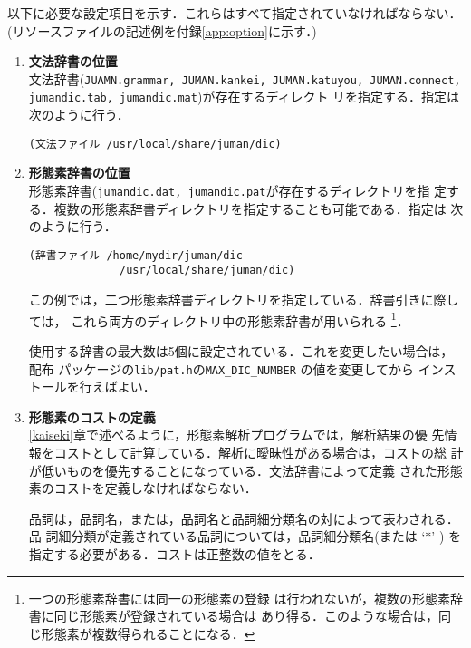 \documentclass[a4j,titlepage]{jarticle}
\begin{document}
以下に必要な設定項目を示す．これらはすべて指定されていなければならない．
(リソースファイルの記述例を付録\ref{app:option}に示す．)

\begin{enumerate}
\item {\bf 文法辞書の位置}\\
文法辞書({\tt JUAMN.grammar, JUMAN.kankei, JUMAN.katuyou,
JUMAN.connect, jumandic.tab, jumandic.mat})が存在するディレクト
リを指定する．指定は次のように行う．

\begin{verbatim}
(文法ファイル /usr/local/share/juman/dic)
\end{verbatim}

\item {\bf 形態素辞書の位置}\\
形態素辞書({\tt jumandic.dat, jumandic.pat}が存在するディレクトリを指
定する．複数の形態素辞書ディレクトリを指定することも可能である．指定は
次のように行う．

\begin{verbatim}
(辞書ファイル /home/mydir/juman/dic
              /usr/local/share/juman/dic)
\end{verbatim}

この例では，二つ形態素辞書ディレクトリを指定している．辞書引きに際しては，
これら両方のディレクトリ中の形態素辞書が用いられる
\footnote{一つの形態素辞書には同一の形態素の登録
は行われないが，複数の形態素辞書に同じ形態素が登録されている場合は
あり得る．このような場合は，同じ形態素が複数得られることになる．}．

使用する辞書の最大数は5個に設定されている．これを変更したい場合は，配布
パッケージの{\tt lib/pat.h}の{\tt MAX\_DIC\_NUMBER} の値を変更してから
インストールを行えばよい．

\item {\bf 形態素のコストの定義}\\
\ref{kaiseki}章で述べるように，形態素解析プログラムでは，解析結果の優
先情報をコストとして計算している．解析に曖昧性がある場合は，コストの総
計が低いものを優先することになっている．文法辞書によって定義
された形態素のコストを定義しなければならない．

品詞は，品詞名，または，品詞名と品詞細分類名の対によって表わされる．品
詞細分類が定義されている品詞については，品詞細分類名(または `$\ast$' )
を指定する必要がある．コストは正整数の値をとる．


\end{enumerate}
\end{document}
